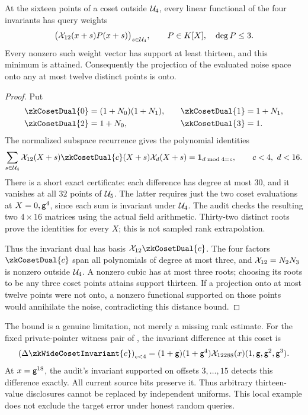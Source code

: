 \begin{lemma}\label{lem:zk-sixteen-dual}
At the sixteen points of a coset outside $\mathcal{U}_4$, every linear functional of the four invariants has query weights
\[
 \bigl(\mathcal{X}_{12}(x+s)P(x+s)\bigr)_{s\in\mathcal{U}_4},
 \qquad P\in K[X],\quad\deg P\le3.
\]
Every nonzero such weight vector has support at least thirteen, and this minimum is attained. Consequently the projection of the evaluated noise space onto any at most twelve distinct points is onto.
\end{lemma}
\begin{proof}
Put
\[
 \begin{aligned}
 \zkCosetDual{0}&=(1+N_0)(1+N_1),&\quad \zkCosetDual{1}&=1+N_1,\\
 \zkCosetDual{2}&=1+N_0,&\quad \zkCosetDual{3}&=1.
 \end{aligned}
\]
The normalized subspace recurrence gives the polynomial identities
\[
 \sum_{s\in\subsp_4}\novel_{12}(X+s)\zkCosetDual{c}(X+s)\novel_d(X+s)
 =\mathbf1_{d\bmod4=c},\qquad c<4,\ d<16.
\]
There is a short exact certificate: each difference has degree at most $30$, and it vanishes at all $32$ points of $\mathcal{U}_5$. The latter requires just the two coset evaluations at $X=0,\mathsf{g}^4$, since each sum is invariant under $\mathcal{U}_4$. The audit checks the resulting two $4\times16$ matrices using the actual field arithmetic. Thirty-two distinct roots prove the identities for every $X$; this is not sampled rank extrapolation.

Thus the invariant dual has basis $\novel_{12}\zkCosetDual{c}$. The four factors $\zkCosetDual{c}$ span all polynomials of degree at most three, and $\mathcal{X}_{12}=N_2N_3$ is nonzero outside $\mathcal{U}_4$. A nonzero cubic has at most three roots; choosing its roots to be any three coset points attains support thirteen. If a projection onto at most twelve points were not onto, a nonzero functional supported on those points would annihilate the noise, contradicting this distance bound.
\end{proof}

The bound is a genuine limitation, not merely a missing rank estimate. For the fixed private-pointer witness pair of , the invariant difference at this coset is
\[
 \left(\Delta\zkWideCosetInvariant{c}\right)_{c<4}
 =(1+\gen)(1+\gen^4)\novel_{12288}(x)(1,\gen,\gen^2,\gen^3).
\]
At $x=\mathsf{g}^{18}$, the audit's invariant supported on offsets $3,\ldots,15$ detects this difference exactly. All current source bits preserve it. Thus arbitrary thirteen-value disclosures cannot be replaced by independent uniforms. This local example does not exclude the target error under honest random queries.

